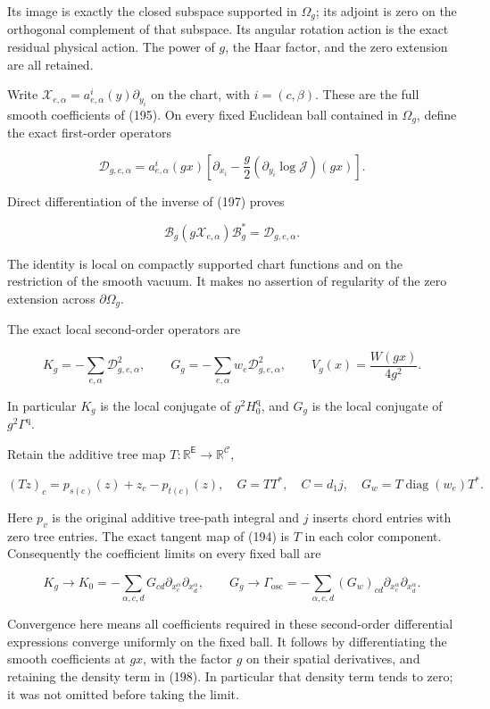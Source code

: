 \documentclass[
  11pt,
]{article}
\begin{document}
Its image is exactly the closed subspace supported in \(\Omega_g\); its
adjoint is zero on the orthogonal complement of that subspace. Its
angular rotation action is the exact residual physical action. The power
of \(g\), the Haar factor, and the zero extension are all retained.

Write \(\mathcal X_{e,\alpha}=a_{e,\alpha}^i(y)\partial_{y_i}\) on the
chart, with \(i=(c,\beta)\). These are the full smooth coefficients of
(195). On every fixed Euclidean ball contained in \(\Omega_g\), define
the exact first-order operators

\[
 \mathcal D_{g,e,\alpha}
 =a_{e,\alpha}^i(gx)
   \left[\partial_{x_i}
        -\frac g2(\partial_{y_i}\log\mathcal J)(gx)\right].
\tag{198}
\]

Direct differentiation of the inverse of (197) proves

\[
 \mathcal B_g(g\mathcal X_{e,\alpha})\mathcal B_g^*
 =\mathcal D_{g,e,\alpha}.
\]

The identity is local on compactly supported chart functions and on the
restriction of the smooth vacuum. It makes no assertion of regularity of
the zero extension across \(\partial\Omega_g\).

The exact local second-order operators are

\[
 K_g=-\sum_{e,\alpha}\mathcal D_{g,e,\alpha}^2,\qquad
 G_g=-\sum_{e,\alpha}w_e\mathcal D_{g,e,\alpha}^2,\qquad
 V_g(x)=\frac{W(gx)}{4g^2}.
\tag{199}
\]

In particular \(K_g\) is the local conjugate of \(g^2H_0^{\mathrm q}\),
and \(G_g\) is the local conjugate of \(g^2\Gamma^{\mathrm q}\).

Retain the additive tree map \(T:\mathbb R^{\mathsf E}\to
\mathbb R^{\mathcal C}\),

\[
 (Tz)_c=p_{s(c)}(z)+z_c-p_{t(c)}(z),
 \quad G=TT^*,\quad C=d_1j,\quad
 G_w=T\operatorname{diag}(w_e)T^*.
\tag{200}
\]

Here \(p_v\) is the original additive tree-path integral and \(j\)
inserts chord entries with zero tree entries. The exact tangent map of
(194) is \(T\) in each color component. Consequently the coefficient
limits on every fixed ball are

\[
 K_g\longrightarrow K_0
 =-\sum_{\alpha,c,d}G_{cd}
       \partial_{x_c^\alpha}\partial_{x_d^\alpha},
 \qquad
 G_g\longrightarrow\Gamma_{\mathrm{osc}}
 =-\sum_{\alpha,c,d}(G_w)_{cd}
       \partial_{x_c^\alpha}\partial_{x_d^\alpha}.
\tag{201}
\]

Convergence here means all coefficients required in these second-order
differential expressions converge uniformly on the fixed ball. It
follows by differentiating the smooth coefficients at \(gx\), with the
factor \(g\) on their spatial derivatives, and retaining the density
term in (198). In particular that density term tends to zero; it was not
omitted before taking the limit.
\end{document}
